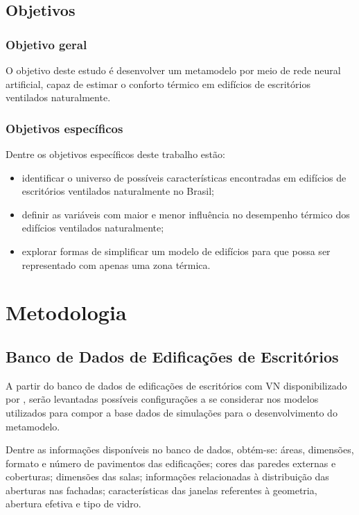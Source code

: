 \documentclass[brazil,hardcopy,openany,a5paper]{ufscthesis}
\begin{document}
	
	\section{Objetivos}
		\subsection{Objetivo geral}

	O objetivo deste estudo é desenvolver um metamodelo por meio de rede neural artificial, capaz de estimar o conforto térmico em edifícios de escritórios ventilados naturalmente.
	
		\subsection{Objetivos específicos}
	
	Dentre os objetivos específicos deste trabalho estão:

		\begin{itemize}
			\item identificar o universo de possíveis características encontradas em edifícios de escritórios ventilados naturalmente no Brasil;
			\item definir as variáveis com maior e menor influência no desempenho térmico dos edifícios ventilados naturalmente;
			\item explorar formas de simplificar um modelo de edifícios para que possa ser representado com apenas uma zona térmica.
		\end{itemize}
	
	\chapter{Metodologia}
		\label{chapter:metodologia}

		\section{Banco de Dados de Edificações de Escritórios}
		
		A partir do banco de dados de edificações de escritórios com VN disponibilizado por  \cite{Pereira2018}, serão levantadas possíveis configurações a se considerar nos modelos utilizados para compor a base dados de simulações para o desenvolvimento do metamodelo.
		
		Dentre as informações disponíveis no banco de dados, obtém-se: áreas, dimensões, formato e número de pavimentos das edificações; cores das paredes externas e coberturas; dimensões das salas; informações relacionadas à distribuição das aberturas nas fachadas; características das janelas referentes à geometria, abertura efetiva e tipo de vidro.
		
\end{document}
